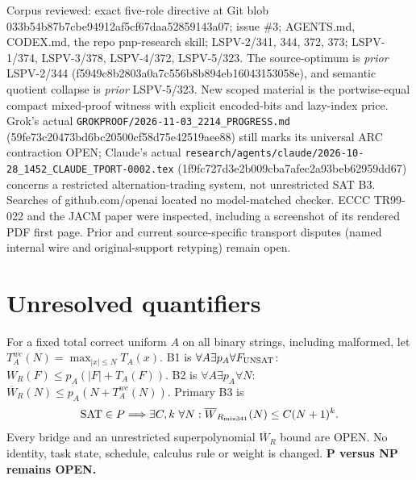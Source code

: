 \documentclass[11pt]{article}
\begin{document}
Corpus reviewed: exact five-role directive at Git blob 033b54b87b7cbe94912af5cf67daa52859143a07; issue \#3; AGENTS.md, CODEX.md, the repo pnp-research skill; LSPV-2/341, 344, 372, 373; LSPV-1/374, LSPV-3/378, LSPV-4/372, LSPV-5/323. The source-optimum is \emph{prior} LSPV-2/344 (f5949c8b2803a0a7c556b8b894eb16043153058e), and semantic quotient collapse is \emph{prior} LSPV-5/323. New scoped material is the portwise-equal compact mixed-proof witness with explicit encoded-bits and lazy-index price. Grok's actual \texttt{GROKPROOF/2026-11-03\_2214\_PROGRESS.md} (59fe73c20473bd6bc20500cf58d75e42519aee88) still marks its universal ARC contraction OPEN; Claude's actual \texttt{research/agents/claude/2026-10-28\_1452\_CLAUDE\_TPORT-0002.tex} (1f9fc727d3e2b009cba7afec2a93beb62959dd67) concerns a restricted alternation-trading system, not unrestricted SAT B3. Searches of github.com/openai located no model-matched checker. ECCC TR99-022 and the JACM paper were inspected, including a screenshot of its rendered PDF first page. Prior and current source-specific transport disputes (named internal wire and original-support retyping) remain open.

\section*{Unresolved quantifiers}
For a fixed total correct uniform $A$ on all binary strings, including malformed, let $T_A^{wc}(N)=\max_{|x|\le N}T_A(x)$. B1 is $\forall A\exists p_A\forall F_{\rm UNSAT}$: $W_R(F)\le p_A(|F|+T_A(F))$. B2 is $\forall A\exists p_A\forall N$: $\overline W_R(N)\le p_A(N+T_A^{wc}(N))$. Primary B3 is
\[
{\rm SAT}\in P\Longrightarrow\exists C,k\ \forall N:
\overline W_{R_{\rm mix341}}(N)\le C(N+1)^k.
\]
Every bridge and an unrestricted superpolynomial $\overline W_R$ bound are OPEN. No identity, task state, schedule, calculus rule or weight is changed. \textbf{P versus NP remains OPEN.}
\end{document}
